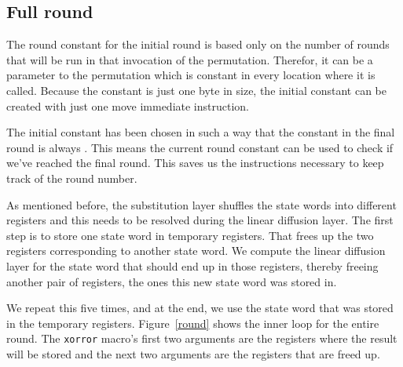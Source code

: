 \subsection{Full round}

The round constant for the initial round is based only on the number of rounds
that will be run in that invocation of the permutation. Therefor, it can be a
parameter to the permutation which is constant in every location where it is
called. Because the constant is just one byte in size, the initial constant can
be created with just one move immediate instruction.

The initial constant has been chosen in such a way that the constant in the
final round is always . This means the current round constant can be
used to check if we've reached the final round. This saves us the instructions
necessary to keep track of the round number.

As mentioned before, the substitution layer shuffles the state words into
different registers and this needs to be resolved during the linear diffusion
layer. The first step is to store one state word in temporary registers. That
frees up the two registers corresponding to another state word. We compute the
linear diffusion layer for the state word that should end up in those registers,
thereby freeing another pair of registers, the ones this new state word was
stored in.

We repeat this five times, and at the end, we use the state word that was stored
in the temporary registers. Figure~\ref{round} shows the inner loop for the
entire round. The \texttt{xorror} macro's first two arguments are the registers
where the result will be stored and the next two arguments are the registers
that are freed up.


